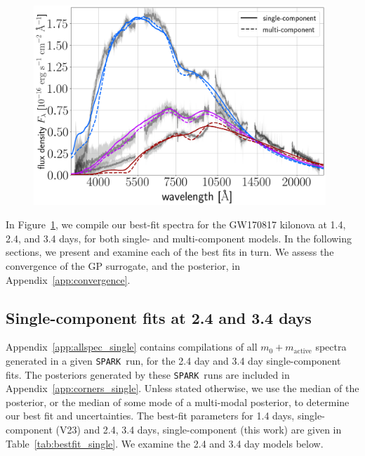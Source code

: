 \documentclass[twocolumn, twocolappendix]{aastex63}
\def\SPARK{\texttt{SPARK}}
\begin{document}
\begin{figure}[!ht]
    \centering
    \includegraphics[width=0.98\textwidth]{figs/bestfits_compare_all_SPARK_2.png}
    \label{fig:bestfits}
\end{figure}


In Figure~\ref{fig:bestfits}, we compile our best-fit spectra for the GW170817 kilonova at 1.4, 2.4, and 3.4 days, for both single- and multi-component models. In the following sections, we present and examine each of the best fits in turn. We assess the convergence of the GP surrogate, and the posterior, in Appendix~\ref{app:convergence}.


\subsection{Single-component fits at 2.4 and 3.4 days}\label{ssc:2.4_3.4_fits}

Appendix~\ref{app:allspec_single} contains compilations of all $m_0 + m_{\mathrm{active}}$ spectra generated in a given \SPARK~run, for the 2.4 day and 3.4 day single-component fits. The posteriors generated by these \SPARK~runs are included in Appendix~\ref{app:corners_single}. Unless stated otherwise, we use the median of the posterior, or the median of some mode of a multi-modal posterior, to determine our best fit and uncertainties. The best-fit parameters for 1.4 days, single-component (V23) and 2.4, 3.4 days, single-component (this work) are given in Table~\ref{tab:bestfit_single}. We examine the 2.4 and 3.4 day models below.
\end{document}
